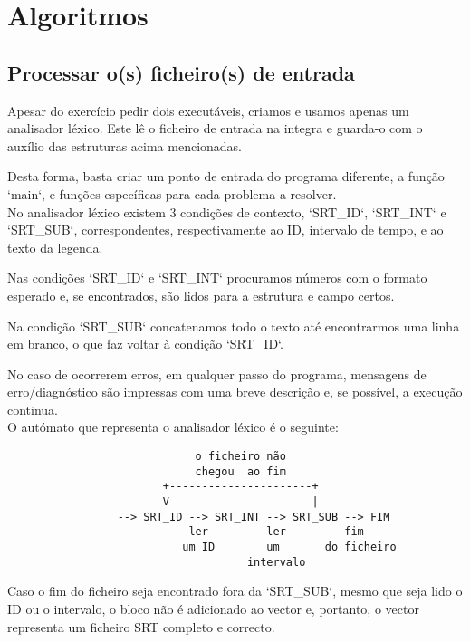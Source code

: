 \documentclass{report}
\begin{document}
\section{Algoritmos}

\subsection{Processar o(s) ficheiro(s) de entrada}

Apesar do exercício pedir dois executáveis, criamos e usamos apenas um analisador léxico. Este lê o ficheiro de entrada na integra e guarda-o com o auxílio das estruturas acima mencionadas.

Desta forma, basta criar um ponto de entrada do programa diferente, a função `main`, e funções específicas para cada problema a resolver.\\

No analisador léxico existem 3 condições de contexto, `SRT\_ID`, `SRT\_INT` e `SRT\_SUB`, correspondentes, respectivamente ao ID, intervalo de tempo, e ao texto da legenda.

Nas condições `SRT\_ID` e `SRT\_INT` procuramos números com o formato esperado e, se encontrados, são lidos para a estrutura e campo certos.

Na condição `SRT\_SUB` concatenamos todo o texto até encontrarmos uma linha em branco, o que faz voltar à condição `SRT\_ID`.

No caso de ocorrerem erros, em qualquer passo do programa, mensagens de erro/diagnóstico são impressas com uma breve descrição e, se possível, a execução continua.\\

O autómato que representa o analisador léxico é o seguinte:

\begin{verbatim}
                             o ficheiro não
                             chegou  ao fim
                        +----------------------+
                        V                      |
                 --> SRT_ID --> SRT_INT --> SRT_SUB --> FIM
                            ler         ler         fim
                           um ID        um       do ficheiro
                                     intervalo
\end{verbatim}

Caso o fim do ficheiro seja encontrado fora da `SRT\_SUB`, mesmo que seja lido o ID ou o intervalo, o bloco não é adicionado ao vector e, portanto, o vector representa um ficheiro SRT completo e correcto.
\end{document}
